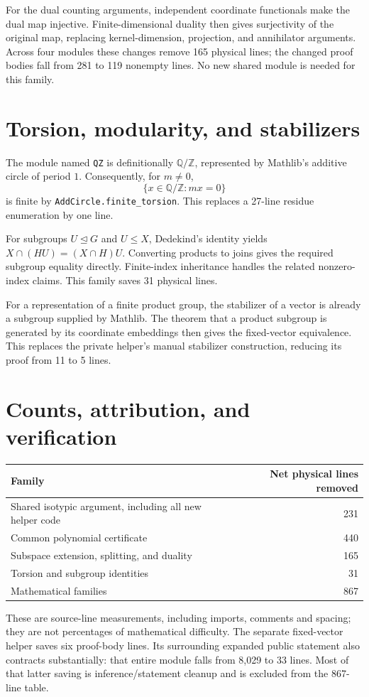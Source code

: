 \documentclass[11pt]{article}
\newcommand{\src}[1]{\nolinkurl{#1}}
\begin{document}
For the dual counting arguments, independent coordinate functionals make
the dual map injective. Finite-dimensional duality then gives surjectivity
of the original map, replacing kernel-dimension, projection, and annihilator
arguments. Across four modules these changes remove 165 physical lines;
the changed proof bodies fall from 281 to 119 nonempty lines. No new shared
module is needed for this family.

\section{Torsion, modularity, and stabilizers}
The module named \src{QZ} is definitionally $\mathbb Q/\mathbb Z$, represented
by Mathlib's additive circle of period $1$. Consequently, for $m\ne0$,
\[
 \{x\in\mathbb Q/\mathbb Z:mx=0\}
\]
is finite by \src{AddCircle.finite_torsion}. This replaces a 27-line
residue enumeration by one line.

For subgroups $U\trianglelefteq G$ and $U\le X$, Dedekind's identity yields
$X\cap(HU)=(X\cap H)U$. Converting products to joins gives the required
subgroup equality directly. Finite-index inheritance handles the related
nonzero-index claims. This family saves 31 physical lines.

For a representation of a finite product group, the stabilizer of a vector
is already a subgroup supplied by Mathlib. The theorem that a product
subgroup is generated by its coordinate embeddings then gives the
fixed-vector equivalence. This replaces the private helper's manual
stabilizer construction, reducing its proof from 11 to 5 lines.

\section{Counts, attribution, and verification}
\begin{center}
\begin{tabular}{lr}
\toprule
Family & Net physical lines removed\\
\midrule
Shared isotypic argument, including all new helper code & 231\\
Common polynomial certificate & 440\\
Subspace extension, splitting, and duality & 165\\
Torsion and subgroup identities & 31\\
\midrule
Mathematical families & 867\\
\bottomrule
\end{tabular}
\end{center}
These are source-line measurements, including imports, comments and spacing;
they are not percentages of mathematical difficulty. The separate fixed-vector
helper saves six proof-body lines. Its surrounding expanded public statement
also contracts substantially: that entire module falls from 8,029 to 33 lines.
Most of that latter saving is inference/statement cleanup and is excluded from
the 867-line table.
\end{document}
